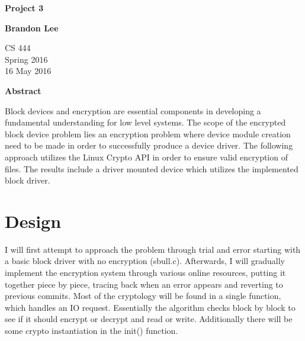 \documentclass[letterpaper,10pt,titlepage]{article}
\begin{document}
\begin{titlepage}
    \begin{center}
        \vspace*{3.5cm}

        \textbf{Project 3}

        \vspace{0.5cm}

        \textbf{Brandon Lee}

        \vspace{0.8cm}

        CS 444\\
        Spring 2016\\
        16 May 2016\\

        \vspace{1cm}

        \textbf{Abstract}\\

        \vspace{0.5cm}

        Block devices and encryption are essential components in developing a fundamental understanding for low level systems.  The scope of the encrypted block device problem lies an encryption problem where device module creation need to be made in order to successfully produce a device driver.  The following approach utilizes the Linux Crypto API in order to ensure valid encryption of files.  The results include a driver mounted device which utilizes the implemented block driver.


        \vfill



    \end{center}
\end{titlepage}

\newpage

\section{Design}

I will first attempt to approach the problem through trial and error starting with a basic block driver with no encryption (sbull.c).  Afterwards, I will gradually implement the encryption system through various online resources, putting it together piece by piece, tracing back when an error appears and reverting to previous commits.  Most of the cryptology will be found in a single function, which handles an IO request.  Essentially the algorithm checks block by block to see if it should encrypt or decrypt and read or write.  Additionally there will be some crypto instantiation in the init() function.
\end{document}
